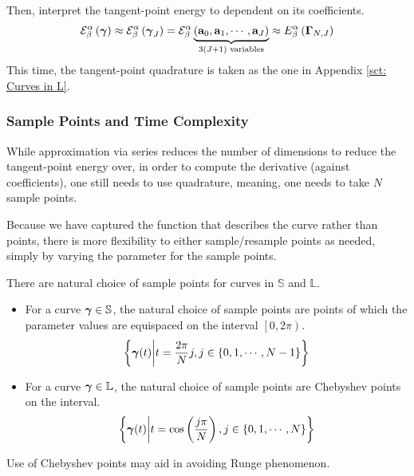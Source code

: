 \documentclass[../dissertation.tex]{subfiles}
\begin{document}
Then, interpret the tangent-point energy to dependent on its coefficients.
\begin{equation}
    \mathcal{E}_{\beta}^{\alpha} \left( \boldsymbol{\gamma} \right)
    \approx
    \mathcal{E}_{\beta}^{\alpha} \left( \boldsymbol{\gamma}_{J} \right)
    =
    \mathcal{E}_{\beta}^{\alpha} \underbrace{\left( \mathbf{a}_{0}, \mathbf{a}_{1}, \cdots, \mathbf{a}_{J} \right)}_{3\left( J+1 \right) \text{ variables}}
    \approx
    E_{\beta}^{\alpha} \left( \boldsymbol{\Gamma}_{N,J} \right)
\end{equation}
This time, the tangent-point quadrature is taken as the one in Appendix \ref{sct: Curves in L}.

\subsubsection{Sample Points and Time Complexity}
While approximation via series reduces the number of dimensions to reduce the tangent-point energy over,
in order to compute the derivative (against coefficients),
one still needs to use quadrature, meaning, one needs to take $N$ sample points.

Because we have captured the function that describes the curve rather than points,
there is more flexibility to either sample/resample points as needed,
simply by varying the parameter for the sample points.

There are natural choice of sample points for curves in $\mathbb{S}$ and $\mathbb{L}$.
\begin{itemize}
    \item For a curve $\boldsymbol{\gamma} \in \mathbb{S}$, the natural choice of sample points are points of which the parameter values are equispaced on the interval $\left[ 0,2\pi \right)$.
        \begin{equation}
\left\{ \boldsymbol{\gamma}(t) \middle| t = \frac{2\pi}{N}j, j \in \left\{ 0, 1, \cdots, N-1 \right\} \right\}
        \end{equation}
    \item For a curve $\boldsymbol{\gamma} \in \mathbb{L}$, the natural choice of sample points are Chebyshev points on the interval.
        \begin{equation}
            \left\{ \boldsymbol{\gamma}(t) \middle| t = \cos \left( \frac{j \pi}{N} \right), j \in \left\{ 0, 1, \cdots, N \right\} \right\}
        \end{equation}
\end{itemize}
Use of Chebyshev points may aid in avoiding Runge phenomenon\cite{Trefethen_2020}.
\end{document}
